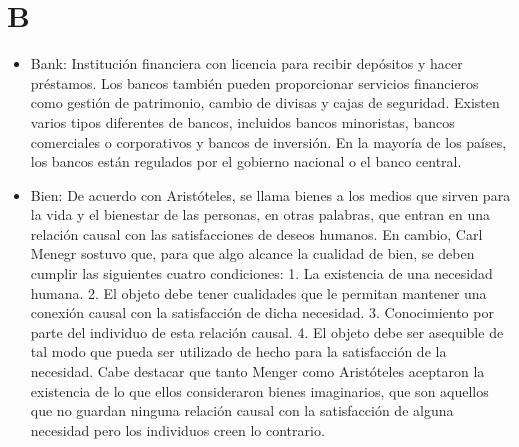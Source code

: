 \documentclass{article}
\begin{document}
\section{B}
\begin{itemize}

\item Bank: Institución financiera con licencia para recibir depósitos y hacer préstamos. Los bancos también pueden proporcionar servicios financieros como gestión de patrimonio, cambio de divisas y cajas de seguridad. Existen varios tipos diferentes de bancos, incluidos bancos minoristas, bancos comerciales o corporativos y bancos de inversión. En la mayoría de los países, los bancos están regulados por el gobierno nacional o el banco central.

\item Bien: De acuerdo con Aristóteles, se llama bienes a los medios que sirven para la vida y el bienestar de las personas, en otras palabras, que entran en una relación causal con las satisfacciones de deseos humanos. En cambio, Carl Menegr sostuvo que, para que algo alcance la cualidad de bien, se deben cumplir las siguientes cuatro condiciones: 1. La existencia de una necesidad humana. 2. El objeto debe tener cualidades que le permitan mantener una conexión causal con la satisfacción de dicha necesidad. 3. Conocimiento por parte del individuo de esta relación causal. 4. El objeto debe ser asequible de tal modo que pueda ser utilizado de hecho para la satisfacción de la necesidad. Cabe destacar que tanto Menger como Aristóteles aceptaron la existencia de lo que ellos consideraron bienes imaginarios, que son aquellos que no guardan ninguna relación causal con la satisfacción de alguna necesidad pero los individuos creen lo contrario. 

\end{itemize}
\end{document}
